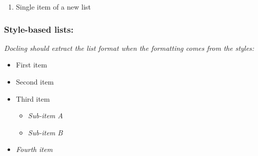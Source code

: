 \documentclass[11pt,a4paper]{article}
\begin{document}
\begin{enumerate}
\item Single item of a new list
\end{enumerate}

\subsubsection{Style-based lists:}

\textit{Docling should extract the list format when the formatting comes from the styles:}

\begin{itemize}
\item First item
\item Second item
\item Third item
  \begin{itemize}
\item \textit{Sub-item A}
\item \textit{Sub-item B}
  \end{itemize}
\item \textit{Fourth item}
\end{itemize}
\end{document}
